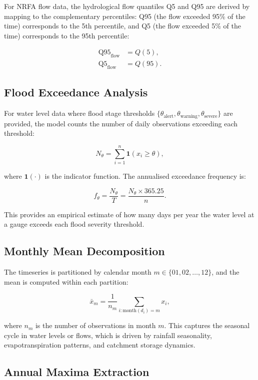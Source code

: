 \documentclass[11pt,a4paper]{article}
\begin{document}
For NRFA flow data, the hydrological flow quantiles Q5 and Q95 are derived by mapping to the complementary percentiles: Q95 (the flow exceeded 95\% of the time) corresponds to the 5th percentile, and Q5 (the flow exceeded 5\% of the time) corresponds to the 95th percentile:

\begin{align}
\text{Q95}_{\text{flow}} &= Q(5), \\
\text{Q5}_{\text{flow}} &= Q(95).
\end{align}

\subsection{Flood Exceedance Analysis}

For water level data where flood stage thresholds $\{\theta_{\text{alert}}, \theta_{\text{warning}}, \theta_{\text{severe}}\}$ are provided, the model counts the number of daily observations exceeding each threshold:

\[
N_\theta = \sum_{i=1}^{n} \mathbf{1}(x_i \geq \theta),
\]

\noindent where $\mathbf{1}(\cdot)$ is the indicator function. The annualised exceedance frequency is:

\[
f_\theta = \frac{N_\theta}{T} = \frac{N_\theta \times 365.25}{n}.
\]

\noindent This provides an empirical estimate of how many days per year the water level at a gauge exceeds each flood severity threshold.

\subsection{Monthly Mean Decomposition}

The timeseries is partitioned by calendar month $m \in \{01, 02, \ldots, 12\}$, and the mean is computed within each partition:

\[
\bar{x}_m = \frac{1}{n_m} \sum_{i : \text{month}(d_i) = m} x_i,
\]

\noindent where $n_m$ is the number of observations in month $m$. This captures the seasonal cycle in water levels or flows, which is driven by rainfall seasonality, evapotranspiration patterns, and catchment storage dynamics.

\subsection{Annual Maxima Extraction}
\end{document}
